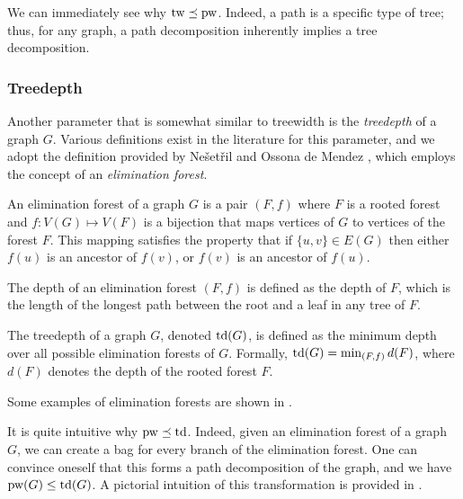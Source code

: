 We can immediately see why $\text{tw} \preceq \text{pw}$. Indeed, a path is a specific type of tree; thus, for any graph, a path decomposition inherently implies a tree decomposition.

\subsubsection*{Treedepth}

Another parameter that is somewhat similar to treewidth is the \textit{treedepth} of a graph $G$. Various definitions exist in the literature for this parameter, and we adopt the definition provided by Ne{\v{s}}et{\v{r}}il and Ossona de Mendez \cite{nevsetvril2006tree}, which employs the concept of an \textit{elimination forest}.

\begin{definition}
    An elimination forest of a graph $G$ is a pair $(F, f)$ where $F$ is a rooted forest and $f : V(G) \mapsto V(F)$ is a bijection that maps vertices of $G$ to vertices of the forest $F$. This mapping satisfies the property that if $\{u, v\} \in E(G)$ then either $f(u)$ is an ancestor of $f(v)$, or $f(v)$ is an ancestor of $f(u)$.
\end{definition}

\begin{definition}
    The depth of an elimination forest $(F, f)$ is defined as the depth of $F$, which is the length of the longest path between the root and a leaf in any tree of $F$.
\end{definition}

\begin{definition}[treedepth]
    The treedepth of a graph $G$, denoted $\text{td}(G)$, is defined as the minimum depth over all possible elimination forests of $G$. Formally, $\text{td}(G) = \min_{(F, f)} d(F)$, where $d(F)$ denotes the depth of the rooted forest $F$.
\end{definition}

Some examples of elimination forests are shown in .



\medskip

It is quite intuitive why $\text{pw} \preceq \text{td}$. Indeed, given an elimination forest of a graph $G$, we can create a bag for every branch of the elimination forest. One can convince oneself that this forms a path decomposition of the graph, and we have $\text{pw}(G) \leq \text{td}(G)$. A pictorial intuition of this transformation is provided in .

